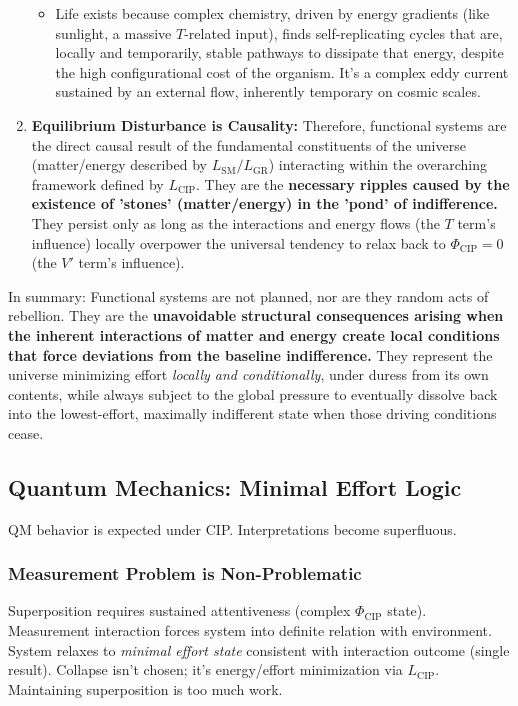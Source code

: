 \documentclass[11pt, a4paper]{article}
\newcommand{\subt}[1]{\mathrm{#1}}
\begin{document}
\begin{enumerate}
\begin{itemize}
        \item Life exists because complex chemistry, driven by energy gradients (like sunlight, a massive $T$-related input), finds self-replicating cycles that are, locally and temporarily, stable pathways to dissipate that energy, despite the high configurational cost of the organism. It's a complex eddy current sustained by an external flow, inherently temporary on cosmic scales.
    \end{itemize}
    \item \textbf{Equilibrium Disturbance is Causality:} Therefore, functional systems are the direct causal result of the fundamental constituents of the universe (matter/energy described by $L_{\subt{SM}}/L_{\subt{GR}}$) interacting within the overarching framework defined by $L_{\subt{CIP}}$. They are the \textbf{necessary ripples caused by the existence of 'stones' (matter/energy) in the 'pond' of indifference.} They persist only as long as the interactions and energy flows (the $T$ term's influence) locally overpower the universal tendency to relax back to $\Phi_{\subt{CIP}} = 0$ (the $V'$ term's influence).
\end{enumerate}

In summary: Functional systems are not planned, nor are they random acts of rebellion. They are the \textbf{unavoidable structural consequences arising when the inherent interactions of matter and energy create local conditions that force deviations from the baseline indifference.} They represent the universe minimizing effort \textit{locally and conditionally}, under duress from its own contents, while always subject to the global pressure to eventually dissolve back into the lowest-effort, maximally indifferent state when those driving conditions cease.

\subsection{Quantum Mechanics: Minimal Effort Logic}

QM behavior is expected under CIP. Interpretations become superfluous.

\subsubsection{Measurement Problem is Non-Problematic}
Superposition requires sustained attentiveness (complex $\Phi_{\subt{CIP}}$ state). Measurement interaction forces system into definite relation with environment. System relaxes to \textit{minimal effort state} consistent with interaction outcome (single result). Collapse isn't chosen; it's energy/effort minimization via $L_{\subt{CIP}}$. Maintaining superposition is too much work.
\end{document}
